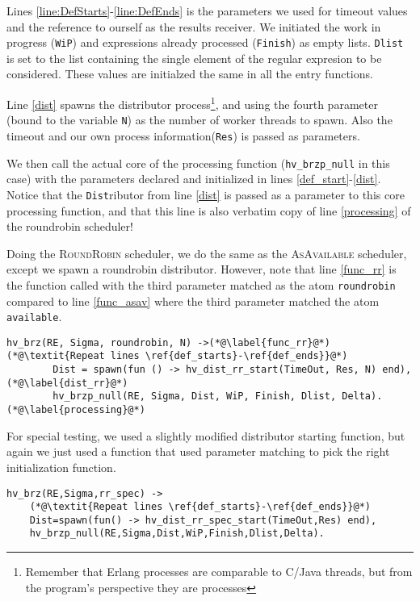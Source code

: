 Lines \ref{line:DefStarts}-\ref{line:DefEnds} is the parameters we used for
timeout values and the reference to ourself as the results receiver.
We initiated the work in progress (\texttt{WiP}) and expressions
already processed (\texttt{Finish}) as empty lists. \texttt{Dlist} is set to
the list containing the single element of the regular expresion to be
considered. These values are initialzed the same in all the entry functions.

Line \ref{dist} spawns the distributor process\footnote{Remember that
	Erlang processes are comparable to C/Java threads, but from the
	program's perspective they are processes}, and using the fourth
parameter (bound to the variable \texttt{N}) as the number of worker
threads to spawn. Also the timeout and our own process
information(\texttt{Res}) is passed as parameters.

We then call the actual core of the processing function (\texttt{hv\_brzp\_null}
in this case) with the parameters declared and initialized in
lines \ref{def_start}-\ref{dist}. Notice that the \texttt{Dist}ributor
from line \ref{dist} is passed as a parameter to this core processing
function, and that this line is also verbatim copy of line
\ref{processing} of the roundrobin scheduler!

Doing the \textsc{RoundRobin} scheduler, we do the same as the \textsc{AsAvailable}
scheduler, except we spawn a roundrobin distributor. However, note
that line \ref{func_rr} is the function called with the third
parameter matched as the atom \texttt{roundrobin} compared to line
\ref{func_asav} where the third parameter matched the atom
\texttt{available}.
\begin{lstlisting}[name=hvp2]
hv_brz(RE, Sigma, roundrobin, N) ->(*@\label{func_rr}@*)
(*@\textit{Repeat lines \ref{def_starts}-\ref{def_ends}}@*)
		Dist = spawn(fun () -> hv_dist_rr_start(TimeOut, Res, N) end),(*@\label{dist_rr}@*)
		hv_brzp_null(RE, Sigma, Dist, WiP, Finish, Dlist, Delta).(*@\label{processing}@*)
\end{lstlisting}

For special testing, we used a slightly modified distributor starting
function, but again we just used a function that used parameter
matching to pick the right initialization function. 
\begin{lstlisting}[name=hvp2]
%Specialized one with only two named receivers using the RoundRobin method 
hv_brz(RE,Sigma,rr_spec) ->
	(*@\textit{Repeat lines \ref{def_starts}-\ref{def_ends}}@*)
	Dist=spawn(fun() -> hv_dist_rr_spec_start(TimeOut,Res) end),
	hv_brzp_null(RE,Sigma,Dist,WiP,Finish,Dlist,Delta).
\end{lstlisting}

